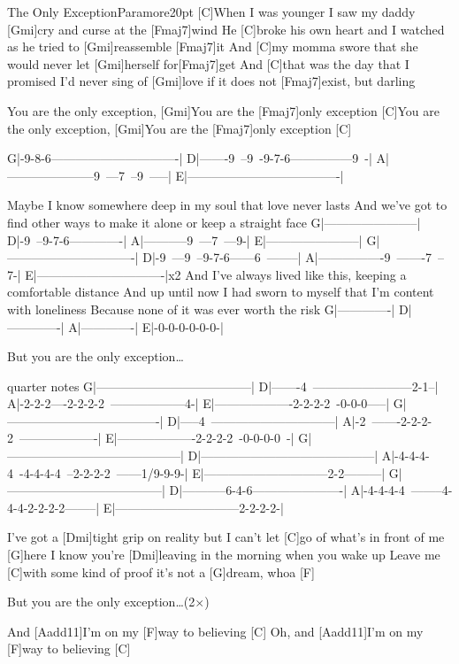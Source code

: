 \begin{song}{The Only Exception}{Paramore}{20pt}
%
[C]When I was younger I saw my daddy [Gmi]cry and curse at the [Fmaj7]wind
He [C]broke his own heart and I watched as he tried to [Gmi]reassemble [Fmaj7]it
And [C]my momma swore that she would never let [Gmi]herself for[Fmaj7]get
And [C]that was the day that I promised I'd never sing of [Gmi]love
if it does not [Fmaj7]exist, but darling

\chorus%
[C]You are the only exception, [Gmi]You are the [Fmaj7]only exception
[C]You are the only exception, [Gmi]You are the [Fmaj7]only exception [C]{}

\tabs{80pt}
G|-9-8-6-------------------------------|
D|-------9~--9~-9-7-6---------------9~-|
A|---------------------9~---7~--9~-----|
E|-------------------------------------|
\endtabs

%
Maybe I know somewhere deep in my soul that love never lasts
And we've got to find other ways to make it alone or keep a straight face
\tabs{80pt}
G|-----------------------|
D|-9~--9-7-6-------------|
A|-----------9~---7~---9-|
E|-----------------------|
\endtabs
\tabs{80pt}
G|-------------------------------|
D|-9~---9~--9-7-6------6~--------|
A|----------------9~-------7~--7-|
E|-------------------------------|x2
\endtabs
And I've always lived like this, keeping a comfortable distance
And up until now I had sworn to myself that I'm content with loneliness
Because none of it was ever worth the risk
\tabs{80pt}
G|-------------|
D|-------------|
A|-------------|
E|-0-0-0-0-0-0-|
\endtabs

\chorus But you are the only exception\dots

\tabs{50pt}
quarter notes
G|--------------------------------------|
D|-------4~------------------------2-1--|
A|-2-2-2----2-2-2-2~------------------4-|
E|-------------------2-2-2-2~-0-0-0-----|
\endtabs
\tabs{50pt}
G|-------------------------------------|
D|-----4~------------------------------|
A|-2~-------2-2-2-2~-------------------|
E|-------------------2-2-2-2~-0-0-0-0~-|
\endtabs
\tabs{50pt}
G|------------------------------------------|
D|------------------------------------------|
A|-4-4-4-4~-4-4-4-4~--2-2-2-2~------1/9-9-9-|
E|------------------------------2-2---------|
\endtabs
\tabs{50pt}
G|--------------------------------------|
D|-----------6-4-6----------------------|
A|-4-4-4-4~--------4-4-4-2-2-2-2--------|
E|------------------------------2-2-2-2-|
\endtabs

\verse{*}%
I've got a [Dmi]tight grip on reality but I can't 
let [C]go of what's in front of me [G]here
I know you're [Dmi]leaving in the morning when you wake up
Leave me [C]with some kind of proof it's not a [G]dream, whoa [F]{}

\chorus But you are the only exception\dots (2$\times$)

\verse{*}%
And [Aadd11]I'm on my [F]way to believing [C]{}
Oh, and [Aadd11]I'm on my [F]way to believing [C]{}
\end{song}
